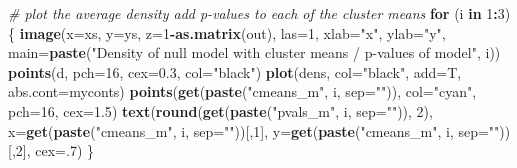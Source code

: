 \documentclass[]{article}
\newenvironment{Shaded}{\begin{snugshade}}{\end{snugshade}}
\newcommand{\CommentTok}[1]{\textcolor[rgb]{0.56,0.35,0.01}{\textit{#1}}}
\newcommand{\ControlFlowTok}[1]{\textcolor[rgb]{0.13,0.29,0.53}{\textbf{#1}}}
\newcommand{\DataTypeTok}[1]{\textcolor[rgb]{0.13,0.29,0.53}{#1}}
\newcommand{\DecValTok}[1]{\textcolor[rgb]{0.00,0.00,0.81}{#1}}
\newcommand{\FloatTok}[1]{\textcolor[rgb]{0.00,0.00,0.81}{#1}}
\newcommand{\KeywordTok}[1]{\textcolor[rgb]{0.13,0.29,0.53}{\textbf{#1}}}
\newcommand{\NormalTok}[1]{#1}
\newcommand{\OperatorTok}[1]{\textcolor[rgb]{0.81,0.36,0.00}{\textbf{#1}}}
\newcommand{\StringTok}[1]{\textcolor[rgb]{0.31,0.60,0.02}{#1}}
\begin{document}
\begin{Shaded}
\begin{Highlighting}[]
\CommentTok{# plot the average density add p-values to each of the cluster means}
\ControlFlowTok{for}\NormalTok{ (i }\ControlFlowTok{in} \DecValTok{1}\OperatorTok{:}\DecValTok{3}\NormalTok{) \{}
  \KeywordTok{image}\NormalTok{(}\DataTypeTok{x=}\NormalTok{xs, }\DataTypeTok{y=}\NormalTok{ys, }\DataTypeTok{z=}\DecValTok{1}\OperatorTok{-}\KeywordTok{as.matrix}\NormalTok{(out), }\DataTypeTok{las=}\DecValTok{1}\NormalTok{, }\DataTypeTok{xlab=}\StringTok{"x"}\NormalTok{, }\DataTypeTok{ylab=}\StringTok{"y"}\NormalTok{,}
        \DataTypeTok{main=}\KeywordTok{paste}\NormalTok{(}\StringTok{"Density of null model with cluster means / p-values of model"}\NormalTok{, i))}
  \KeywordTok{points}\NormalTok{(d, }\DataTypeTok{pch=}\DecValTok{16}\NormalTok{, }\DataTypeTok{cex=}\FloatTok{0.3}\NormalTok{, }\DataTypeTok{col=}\StringTok{"black"}\NormalTok{)}
  \KeywordTok{plot}\NormalTok{(dens, }\DataTypeTok{col=}\StringTok{"black"}\NormalTok{, }\DataTypeTok{add=}\NormalTok{T, }\DataTypeTok{abs.cont=}\NormalTok{myconts)}
  \KeywordTok{points}\NormalTok{(}\KeywordTok{get}\NormalTok{(}\KeywordTok{paste}\NormalTok{(}\StringTok{"cmeans_m"}\NormalTok{, i, }\DataTypeTok{sep=}\StringTok{""}\NormalTok{)), }\DataTypeTok{col=}\StringTok{"cyan"}\NormalTok{, }\DataTypeTok{pch=}\DecValTok{16}\NormalTok{, }\DataTypeTok{cex=}\FloatTok{1.5}\NormalTok{)}
  \KeywordTok{text}\NormalTok{(}\KeywordTok{round}\NormalTok{(}\KeywordTok{get}\NormalTok{(}\KeywordTok{paste}\NormalTok{(}\StringTok{"pvals_m"}\NormalTok{, i, }\DataTypeTok{sep=}\StringTok{""}\NormalTok{)), }\DecValTok{2}\NormalTok{),}
       \DataTypeTok{x=}\KeywordTok{get}\NormalTok{(}\KeywordTok{paste}\NormalTok{(}\StringTok{"cmeans_m"}\NormalTok{, i, }\DataTypeTok{sep=}\StringTok{""}\NormalTok{))[,}\DecValTok{1}\NormalTok{],}
       \DataTypeTok{y=}\KeywordTok{get}\NormalTok{(}\KeywordTok{paste}\NormalTok{(}\StringTok{"cmeans_m"}\NormalTok{, i, }\DataTypeTok{sep=}\StringTok{""}\NormalTok{))[,}\DecValTok{2}\NormalTok{], }\DataTypeTok{cex=}\NormalTok{.}\DecValTok{7}\NormalTok{)}
\NormalTok{\}}
\end{Highlighting}
\end{Shaded}
\end{document}

